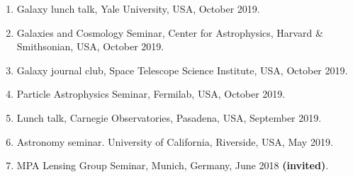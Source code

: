 \documentclass[margin, line]{res}
\begin{document}
\begin{resume}
\begin{enumerate}
	\item Galaxy lunch talk, Yale University, USA, October 2019.
	\item Galaxies and Cosmology Seminar, Center for Astrophysics, Harvard \& Smithsonian, USA, October 2019.
	\item Galaxy journal club, Space Telescope Science Institute, USA, October 2019.
	\item Particle Astrophysics Seminar, Fermilab, USA, October 2019.
	\item Lunch talk, Carnegie Observatories, Pasadena, USA, September 2019.
	\item Astronomy seminar. University of California, Riverside, USA, May 2019. 
	\item MPA Lensing Group Seminar, Munich, Germany, June 2018 \textbf{(invited)}.
\end{enumerate}



\end{resume}
\end{document}
